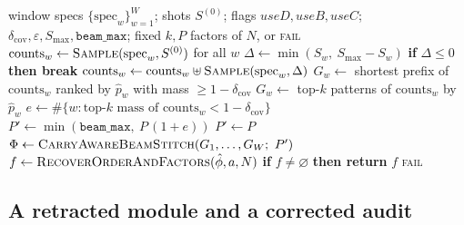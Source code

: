 \documentclass[preprint,11pt]{elsarticle}
\newcommand{\Cw}{C_w}
\newcommand{\dcov}{\delta_{\mathrm{cov}}}
\newcommand{\Smax}{S_{\max}}
\newcommand{\beammax}{\texttt{beam\_max}}
\begin{document}
\begin{algorithm}[htbp]
\caption{Confidence-guided adaptive reconstruction. Inputs are the
window specifications, the sampling configuration, the three module
flags, and the parameters of Table~\ref{tab:params}. Lines marked
\textbf{[D]}, \textbf{[B]} and \textbf{[C]} are the only departures from
the published pipeline.}
\label{alg:adaptive}
\small
\begin{algorithmic}[1]
\Require window specs $\{\mathrm{spec}_w\}_{w=1}^{W}$; shots $S^{(0)}$;
flags $\textit{useD},\textit{useB},\textit{useC}$; $\dcov,\varepsilon,\Smax,\beammax$; fixed $k,P$
\Ensure factors of $N$, or \textsc{fail}
\State $\mathrm{counts}_w \gets \textsc{Sample}(\mathrm{spec}_w, S^{(0)})$ for all $w$
\Statex
{}
    \While{$\Cw(\mathrm{counts}_w) < 1-\varepsilon$}
      \State $\Delta \gets \min(S_w,\ \Smax - S_w)$
      \State \textbf{if} $\Delta \le 0$ \textbf{then break}
      \State $\mathrm{counts}_w \gets \mathrm{counts}_w \uplus \textsc{Sample}(\mathrm{spec}_w, \Delta)$
    \EndWhile
  \EndFor
\EndIf
\Statex
{}
    \State $G_w \gets$ shortest prefix of $\mathrm{counts}_w$ ranked by
           $\hat p_w$ with mass $\ge 1-\dcov$ 
  \Else
    \State $G_w \gets$ top-$k$ patterns of $\mathrm{counts}_w$ by $\hat p_w$
  \EndIf
\EndFor
\Statex
{}
  \State $e \gets \#\{w : \text{top-}k\text{ mass of } \mathrm{counts}_w < 1-\dcov\}$
  \State $P' \gets \min(\beammax,\ P\,(1+e))$
\Else
  \State $P' \gets P$
\EndIf
\Statex
\State $\Phi \gets \textsc{CarryAwareBeamStitch}(G_1,\dots,G_W;\ P')$
  \State $f \gets \textsc{RecoverOrderAndFactors}(\hat\phi, a, N)$
  \State \textbf{if} $f \ne \varnothing$ \textbf{then return} $f$
\EndFor
\State \Return \textsc{fail}
\end{algorithmic}
\end{algorithm}

\subsection{A retracted module and a corrected audit}
\label{sec:retraction}
\end{document}
